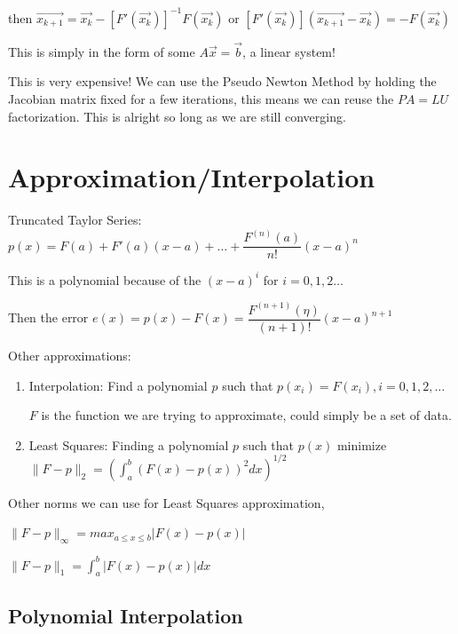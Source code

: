 \documentclass{article}
\begin{document}
then $\vec{x_{k + 1}} = \vec{x_k} - [F'(\vec{x_k})]^{-1} F(\vec{x_k})$ or $[F'(\vec{x_k})] (\vec{x_{k + 1}} - \vec{x_k}) = -F(\vec{x_k})$

This is simply in the form of some $A \vec{x} = \vec{b}$, a linear system!

This is very expensive! We can use the Pseudo Newton Method by holding the Jacobian matrix fixed for a few iterations, this means we can reuse the $PA = LU$ factorization. This is alright so long as we are still converging.

\section{Approximation/Interpolation}

Truncated Taylor Series: $p(x) = F(a) + F'(a)(x - a) + \dots + \dfrac{F^{(n)}(a)}{n!}(x - a)^n$

This is a polynomial because of the $(x - a)^i$ for $i = 0, 1, 2 \dots$

Then the error $e(x) = p(x) - F(x) = \dfrac{F^{(n + 1)}(\eta)}{(n + 1)!} (x - a)^{n + 1}$

\vspace{0.2cm}

Other approximations:

\begin{enumerate}
    \item Interpolation: Find a polynomial $p$ such that $p(x_i) = F(x_i), i = 0, 1, 2, \dots$
    
    $F$ is the function we are trying to approximate, could simply be a set of data.
    
    \item Least Squares: Finding a polynomial $p$ such that $p(x)$ minimize $\| F - p \|_2 = \left(\displaystyle \int_a^b (F(x) - p(x))^2 dx \right)^{1/2}$
\end{enumerate}

\vspace{0.3cm}

Other norms we can use for Least Squares approximation, 

\vspace{0.1cm}

$\| F - p\|_{\infty} = max_{a \leq x \leq b} |F(x) - p(x)|$

$\| F - p\|_{1} = \displaystyle \int_a^b |F(x) - p(x)| dx$

\subsection{Polynomial Interpolation}
\end{document}
